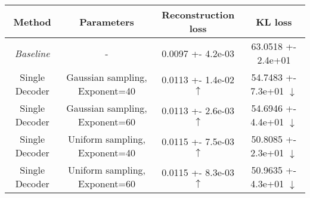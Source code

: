 \centering
\scriptsize
\begin{tabular}{||c|c|c|c||}
\hline
 Method & Parameters & Reconstruction loss & KL loss \\
\hline
\textit{Baseline} & - & 0.0097 +- 4.2e-03 & 63.0518 +- 2.4e+01 \\
\hline
Single Decoder & Gaussian sampling, Exponent=40 & 0.0113 +- 1.4e-02  $\uparrow$ & 54.7483 +- 7.3e+01  $\downarrow$ \\
\hline
Single Decoder & Gaussian sampling, Exponent=60 & 0.0113 +- 2.6e-03  $\uparrow$ & 54.6946 +- 4.4e+01  $\downarrow$ \\
\hline
Single Decoder & Uniform sampling, Exponent=40 & 0.0115 +- 7.5e-03  $\uparrow$ & 50.8085 +- 2.3e+01  $\downarrow$ \\
\hline
Single Decoder & Uniform sampling, Exponent=60 & 0.0115 +- 8.3e-03  $\uparrow$ & 50.9635 +- 4.3e+01  $\downarrow$ \\
\hline
\end{tabular}
